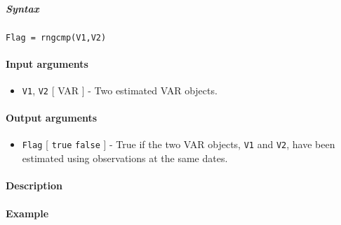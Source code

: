 


	\subparagraph{Syntax}

\begin{verbatim}
Flag = rngcmp(V1,V2)
\end{verbatim}

\paragraph{Input arguments}

\begin{itemize}
\itemsep1pt\parskip0pt
\item
  \texttt{V1}, \texttt{V2} {[} VAR {]} - Two estimated VAR objects.
\end{itemize}

\paragraph{Output arguments}

\begin{itemize}
\itemsep1pt\parskip0pt
\item
  \texttt{Flag} {[} \texttt{true} \textbar{} \texttt{false} {]} - True
  if the two VAR objects, \texttt{V1} and \texttt{V2}, have been
  estimated using observations at the same dates.
\end{itemize}

\paragraph{Description}

\paragraph{Example}



